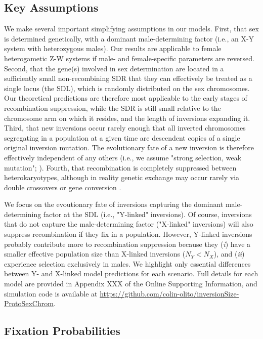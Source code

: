\documentclass{article}
\newcommand\hl[1]{%
  \bgroup
  \hskip0pt\color{blue!80!black}%
  #1%
  \egroup
}
\begin{document}
\subsection*{Key Assumptions}
We make several important simplifying assumptions in our models. First, that sex is determined genetically, with a dominant male-determining factor (i.e., an X-Y system with heterozygous males). Our results are applicable to female heterogametic Z-W systems if male- and female-specific parameters are reversed. Second, that the gene(s) involved in sex determination are located in a sufficiently small non-recombining SDR that they can effectively be treated as a single locus (the SDL), which is randomly distributed on the sex chromosomes. Our theoretical predictions are therefore most applicable to the early stages of recombination suppression, while the SDR is still small relative to the chromosome arm on which it resides, and the length of inversions expanding it. Third, that new inversions occur rarely enough that all inverted chromosomes segregating in a population at a given time are descendent copies of a single original inversion mutation. The evolutionary fate of a new inversion is therefore effectively independent of any others (i.e., we assume "strong selection, weak mutation"; \citealt{Gillespie1991}). Fourth, that recombination is completely suppressed between heterokaryotypes, although in reality genetic exchange may occur rarely via double crossovers or gene conversion \citep{KrimbasPowell1992, KorunesNoor2019}.

We focus on the evoutionary fate of inversions capturing the dominant male-determining factor at the SDL (i.e., "Y-linked" inversions). Of course, inversions that do not capture the male-determining factor ("X-linked" inversions) will also suppress recombination if they fix in a population. However, Y-linked inversions probably contribute more to recombination suppression because they ({\itshape i}) have a smaller effective population size than X-linked inversions ($N_Y < N_X$), and ({\itshape ii}) experience selection exclusively in males. We highlight only essential differences between Y- and X-linked model predictions for each scenario. Full details for each model are provided in Appendix \hl{XXX} of the Online Supporting Information, and simulation code is available at \url{https://github.com/colin-olito/inversionSize-ProtoSexChrom}.


\subsection*{Fixation Probabilities}
\end{document}
